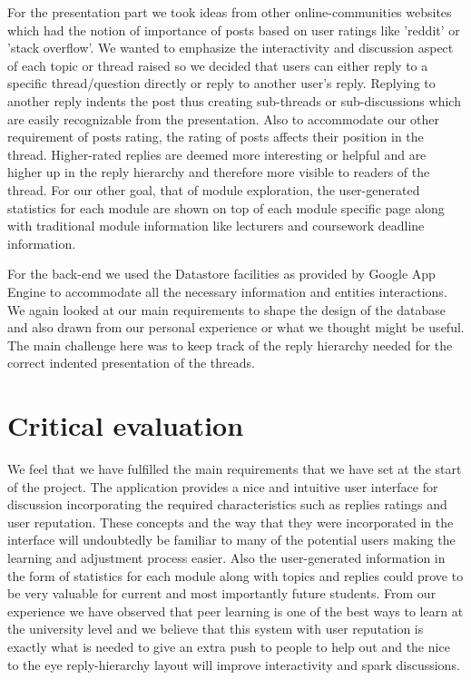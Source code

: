 \documentclass[12pt,a4paper,titlepage]{article}
\begin{document}
For the presentation part we took ideas from other online-communities websites which had the notion of importance of posts based on user ratings like 'reddit' or 'stack overflow'.  We wanted to emphasize the interactivity and discussion aspect of each topic or thread raised so we decided that users can either reply to a specific thread/question directly or reply to another user's reply. Replying to another reply indents the post thus creating sub-threads or sub-discussions which are easily recognizable from the presentation. Also to accommodate our other requirement of posts rating, the rating of posts affects their position in the thread. Higher-rated replies are deemed more interesting or helpful and are higher up in the reply hierarchy and therefore more visible to readers of the thread. For our other goal, that of module exploration, the user-generated statistics for each module are shown on top of each module specific page along with traditional module information like lecturers and coursework deadline information.

For the back-end we used the Datastore facilities as provided by Google App Engine to accommodate all the necessary information and entities interactions. We again looked at our main requirements to shape the design of the database and also drawn from our personal experience or what we thought might be useful. The main challenge here was to keep track of the reply hierarchy needed for the correct indented presentation of the threads.
\newpage
\section{Critical evaluation}
We feel that we have fulfilled the main requirements that we have set at the start of the project. The application provides a nice and intuitive user interface for discussion incorporating the required characteristics such as replies ratings and user reputation. These concepts and the way that they were incorporated in the interface will undoubtedly be familiar to many of the potential users making the learning and adjustment process easier. Also the user-generated information in the form of statistics for each module along with topics and replies could prove to be very valuable for current and most importantly future students. From our experience we have observed that peer learning is one of the best ways to learn at the university level and we believe that this system with user reputation is exactly what is needed to give an extra push to people to help out and the nice to the eye reply-hierarchy layout will improve interactivity and spark discussions.
\end{document}
